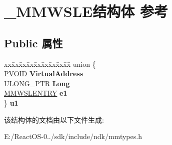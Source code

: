 \hypertarget{struct___m_m_w_s_l_e}{}\section{\+\_\+\+M\+M\+W\+S\+L\+E结构体 参考}
\label{struct___m_m_w_s_l_e}
\subsection*{Public 属性}
\begin{DoxyCompactItemize}
\item 
\mbox{\label{struct___m_m_w_s_l_e_ad135941034a264641ccdfc85b76bfc4f}} 
\begin{tabbing}
xx\=xx\=xx\=xx\=xx\=xx\=xx\=xx\=xx\=\kill
union \{\\
\>\hyperlink{interfacevoid}{PVOID} {\bfseries VirtualAddress}\\
\>ULONG\_PTR {\bfseries Long}\\
\>\hyperlink{struct___m_m_w_s_l_e_n_t_r_y}{MMWSLENTRY} {\bfseries e1}\\
\} {\bfseries u1}\\

\end{tabbing}\end{DoxyCompactItemize}


该结构体的文档由以下文件生成\+:\begin{DoxyCompactItemize}
\item 
E\+:/\+React\+O\+S-\/0../sdk/include/ndk/mmtypes.\+h\end{DoxyCompactItemize}
